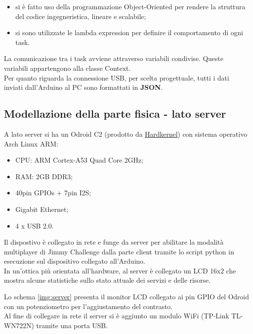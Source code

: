 \begin{itemize}	
	\item si è fatto uso della programmazione Object-Oriented per rendere la struttura del codice ingegneristica, lineare e scalabile;
	\item si sono utilizzate le lambda expression per definire il comportamento di ogni task.
\end{itemize}
La comunicazione tra i task avviene attraverso variabili condivise. Queste variabili appartengono alla classe Context.\\
Per quanto riguarda la connessione USB, per scelta progettuale, tutti i dati inviati dall'Arduino al PC sono formattati in \textbf{JSON}.

\subsection{Modellazione della parte fisica - lato server}
A lato server si ha un Odroid C2 (prodotto da \href{http://www.hardkernel.com/main/main.php}{Hardkernel}) con sistema operativo Arch Linux ARM:
\begin{itemize}
	\item CPU: ARM Cortex-A53 Quad Core 2GHz;
	\item RAM: 2GB DDR3;
	\item 40pin GPIOs + 7pin I2S;
	\item Gigabit Ethernet;
	\item 4 x USB 2.0.
\end{itemize}
Il dispostivo è collegato in rete e funge da server per abilitare la modalità multiplayer di Jimmy Challenge dalla parte client tramite lo script python in esecuzione sul dispositivo collegato all'Arduino.\\
In un'ottica più orientata all'hardware, al server è collegato un LCD 16x2 che mostra alcune statistiche sullo stato attuale dei servizi e delle risorse.

Lo schema \ref{img:server} presenta il monitor LCD collegato ai pin GPIO del Odroid con un potenziometro per l'aggiustamento del contrasto.\\
Al fine di collegare in rete il server si è aggiunto un modulo WiFi (TP-Link TL-WN722N) tramite una porta USB.


